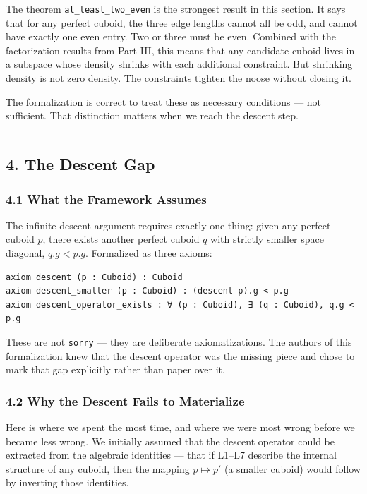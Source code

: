 The theorem \texttt{at\_least\_two\_even} is the strongest result in
this section. It says that for any perfect cuboid, the three edge
lengths cannot all be odd, and cannot have exactly one even entry. Two
or three must be even. Combined with the factorization results from Part
III, this means that any candidate cuboid lives in a subspace whose
density shrinks with each additional constraint. But shrinking density
is not zero density. The constraints tighten the noose without closing
it.

The formalization is correct to treat these as necessary conditions ---
not sufficient. That distinction matters when we reach the descent step.

\begin{center}\rule{0.5\linewidth}{0.5pt}\end{center}

\subsection{4. The Descent Gap}\label{the-descent-gap}

\subsubsection{4.1 What the Framework
Assumes}\label{what-the-framework-assumes}

The infinite descent argument requires exactly one thing: given any
perfect cuboid \(p\), there exists another perfect cuboid \(q\) with
strictly smaller space diagonal, \(q.g < p.g\). Formalized as three
axioms:

\begin{verbatim}
axiom descent (p : Cuboid) : Cuboid
axiom descent_smaller (p : Cuboid) : (descent p).g < p.g
axiom descent_operator_exists : ∀ (p : Cuboid), ∃ (q : Cuboid), q.g < p.g
\end{verbatim}

These are not \texttt{sorry} --- they are deliberate axiomatizations.
The authors of this formalization knew that the descent operator was the
missing piece and chose to mark that gap explicitly rather than paper
over it.

\subsubsection{4.2 Why the Descent Fails to
Materialize}\label{why-the-descent-fails-to-materialize}

Here is where we spent the most time, and where we were most wrong
before we became less wrong. We initially assumed that the descent
operator could be extracted from the algebraic identities --- that if
L1--L7 describe the internal structure of any cuboid, then the mapping
\(p \mapsto p'\) (a smaller cuboid) would follow by inverting those
identities.

